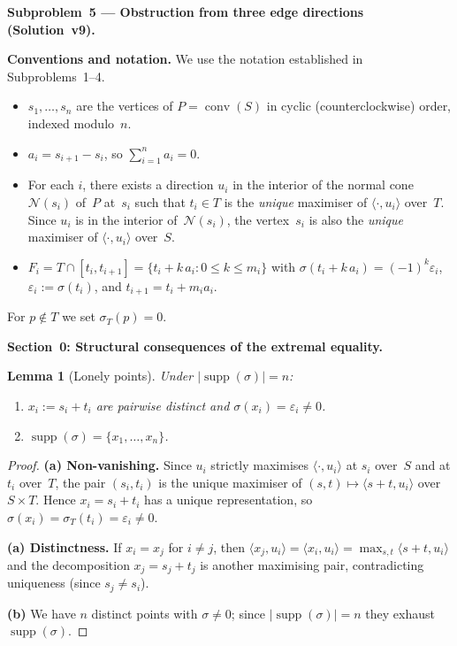 \documentclass{article}
\newtheorem{lemma}{Lemma}
\begin{document}
\textbf{Subproblem~5 --- Obstruction from three edge directions (Solution~v9).}

\medskip
\noindent\textbf{Conventions and notation.}
We use the notation established in Subproblems~1--4.
\begin{itemize}
  \item $s_1,\dots,s_n$ are the vertices of $P=\operatorname{conv}(S)$ in cyclic
        (counterclockwise) order, indexed modulo~$n$.
  \item $a_i = s_{i+1}-s_i$, so $\sum_{i=1}^n a_i = 0$.
  \item For each $i$, there exists a direction $u_i$ in the interior of the normal cone
        $\mathcal{N}(s_i)$ of~$P$ at~$s_i$ such that $t_i\in T$ is the \emph{unique}
        maximiser of $\langle\cdot,u_i\rangle$ over~$T$.
        Since $u_i$ is in the interior of~$\mathcal{N}(s_i)$, the vertex~$s_i$ is
        also the \emph{unique} maximiser of $\langle\cdot,u_i\rangle$ over~$S$.
  \item $F_i = T\cap[t_i,t_{i+1}]=\{t_i+k\,a_i:0\le k\le m_i\}$ with
        $\sigma(t_i+k\,a_i)=(-1)^k\varepsilon_i$, $\varepsilon_i:=\sigma(t_i)$,
        and $t_{i+1}=t_i+m_i a_i$.
\end{itemize}
For $p\notin T$ we set $\sigma_T(p)=0$.

\bigskip
\noindent\textbf{Section~0: Structural consequences of the extremal equality.}

\begin{lemma}[Lonely points]\label{lem:lonely}
Under $|\operatorname{supp}(\sigma)|=n$\textup{:}
\begin{enumerate}
\item[\textup{(a)}] $x_i:=s_i+t_i$ are pairwise distinct and
      $\sigma(x_i)=\varepsilon_i\ne 0$.
\item[\textup{(b)}] $\operatorname{supp}(\sigma)=\{x_1,\dots,x_n\}$.
\end{enumerate}
\end{lemma}
\begin{proof}
\textbf{(a) Non-vanishing.}
Since $u_i$ strictly maximises $\langle\cdot,u_i\rangle$ at $s_i$ over~$S$ and at $t_i$
over~$T$, the pair $(s_i,t_i)$ is the unique maximiser of
$(s,t)\mapsto\langle s+t,u_i\rangle$ over $S\times T$.
Hence $x_i=s_i+t_i$ has a unique representation, so
$\sigma(x_i)=\sigma_T(t_i)=\varepsilon_i\ne 0$.

\textbf{(a) Distinctness.}
If $x_i=x_j$ for $i\ne j$, then
$\langle x_j,u_i\rangle=\langle x_i,u_i\rangle=\max_{s,t}\langle s+t,u_i\rangle$
and the decomposition $x_j=s_j+t_j$ is another maximising pair,
contradicting uniqueness (since $s_j\ne s_i$).

\textbf{(b)} We have $n$ distinct points with $\sigma\ne 0$;
since $|\operatorname{supp}(\sigma)|=n$ they exhaust~$\operatorname{supp}(\sigma)$.
\end{proof}
\end{document}
